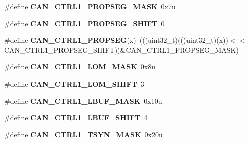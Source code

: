 \begin{DoxyCompactItemize}
\item 
\#define {\bfseries C\+A\+N\+\_\+\+C\+T\+R\+L1\+\_\+\+P\+R\+O\+P\+S\+E\+G\+\_\+\+M\+A\+SK}~0x7u\hypertarget{group__CAN__Register__Masks_ga0541429f7e3d35ec374c462a83c3ef49}{}\label{group__CAN__Register__Masks_ga0541429f7e3d35ec374c462a83c3ef49}

\item 
\#define {\bfseries C\+A\+N\+\_\+\+C\+T\+R\+L1\+\_\+\+P\+R\+O\+P\+S\+E\+G\+\_\+\+S\+H\+I\+FT}~0\hypertarget{group__CAN__Register__Masks_ga7eada40e9f9aafd9d58c38b3a3b295b5}{}\label{group__CAN__Register__Masks_ga7eada40e9f9aafd9d58c38b3a3b295b5}

\item 
\#define {\bfseries C\+A\+N\+\_\+\+C\+T\+R\+L1\+\_\+\+P\+R\+O\+P\+S\+EG}(x)~(((uint32\+\_\+t)(((uint32\+\_\+t)(x))$<$$<$C\+A\+N\+\_\+\+C\+T\+R\+L1\+\_\+\+P\+R\+O\+P\+S\+E\+G\+\_\+\+S\+H\+I\+FT))\&C\+A\+N\+\_\+\+C\+T\+R\+L1\+\_\+\+P\+R\+O\+P\+S\+E\+G\+\_\+\+M\+A\+SK)\hypertarget{group__CAN__Register__Masks_ga57ce21067eb8d33398e104ce39eb5100}{}\label{group__CAN__Register__Masks_ga57ce21067eb8d33398e104ce39eb5100}

\item 
\#define {\bfseries C\+A\+N\+\_\+\+C\+T\+R\+L1\+\_\+\+L\+O\+M\+\_\+\+M\+A\+SK}~0x8u\hypertarget{group__CAN__Register__Masks_gac216e0dd5c6df92a49c15077ca628187}{}\label{group__CAN__Register__Masks_gac216e0dd5c6df92a49c15077ca628187}

\item 
\#define {\bfseries C\+A\+N\+\_\+\+C\+T\+R\+L1\+\_\+\+L\+O\+M\+\_\+\+S\+H\+I\+FT}~3\hypertarget{group__CAN__Register__Masks_gafd8f79e66670cb6df0d70e93795649c6}{}\label{group__CAN__Register__Masks_gafd8f79e66670cb6df0d70e93795649c6}

\item 
\#define {\bfseries C\+A\+N\+\_\+\+C\+T\+R\+L1\+\_\+\+L\+B\+U\+F\+\_\+\+M\+A\+SK}~0x10u\hypertarget{group__CAN__Register__Masks_ga91b1b6502a9996e9639d28760d00ee88}{}\label{group__CAN__Register__Masks_ga91b1b6502a9996e9639d28760d00ee88}

\item 
\#define {\bfseries C\+A\+N\+\_\+\+C\+T\+R\+L1\+\_\+\+L\+B\+U\+F\+\_\+\+S\+H\+I\+FT}~4\hypertarget{group__CAN__Register__Masks_ga1ebb72a42560e1f78bb6f10cfeec8945}{}\label{group__CAN__Register__Masks_ga1ebb72a42560e1f78bb6f10cfeec8945}

\item 
\#define {\bfseries C\+A\+N\+\_\+\+C\+T\+R\+L1\+\_\+\+T\+S\+Y\+N\+\_\+\+M\+A\+SK}~0x20u\hypertarget{group__CAN__Register__Masks_ga2ceb4b7bca561020b4899dd2087e5260}{}\label{group__CAN__Register__Masks_ga2ceb4b7bca561020b4899dd2087e5260}


\end{DoxyCompactItemize}
